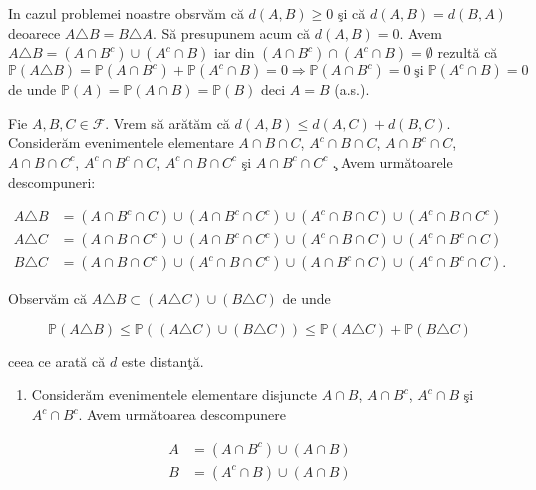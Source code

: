 \documentclass[]{article}
\providecommand{\tightlist}{%
  \setlength{\itemsep}{0pt}\setlength{\parskip}{0pt}}
\def\PP{{\mathbb P}}
\def\MF{{\mathcal F}}
\begin{document}
In cazul problemei noastre obsrv\u am c\u a \(d(A,B)\geq 0\) \c si c\u a
\(d(A,B)=d(B,A)\) deoarece \(A\triangle B=B\triangle A\). S\u a
presupunem acum c\u a \(d(A,B)=0\). Avem
\(A\triangle B=\left(A\cap B^c\right)\cup\left(A^c\cap B\right)\) iar
din \(\left(A\cap B^c\right)\cap\left(A^c\cap B\right)=\emptyset\)
rezult\u a c\u a \[
  \PP(A\triangle B)= \PP(A\cap B^c) + \PP(A^c\cap B)=0\Rightarrow \PP(A\cap B^c)=0\;\mbox{\c si}\;\PP(A^c\cap B)=0
\] de unde \(\PP(A)=\PP(A\cap B)=\PP(B)\) deci \(A=B\) (a.s.).

Fie \(A, B, C\in \MF\). Vrem s\u a ar\u at\u am c\u a
\(d(A,B)\leq d(A,C)+d(B,C)\). Consider\u am evenimentele elementare
\(A\cap B\cap C\), \(A^c\cap B\cap C\), \(A\cap B^c\cap C\),
\(A\cap B\cap C^c\), \(A^c\cap B^c\cap C\), \(A^c\cap B\cap C^c\) \c si
\(A\cap B^c\cap C^c\) \c. Avem urm\u atoarele descompuneri:

\begin{align*}
  A\triangle B &= \left(A\cap B^c\cap C\right)\cup\left(A\cap B^c\cap C^c\right)\cup\left(A^c\cap B\cap C\right)\cup\left(A^c\cap B\cap C^c\right)\\
  A\triangle C &= \left(A\cap B\cap C^c\right)\cup\left(A\cap B^c\cap C^c\right)\cup\left(A^c\cap B\cap C\right)\cup\left(A^c\cap B^c\cap C\right)\\
  B\triangle C &= \left(A\cap B\cap C^c\right)\cup\left(A^c\cap B\cap C^c\right)\cup\left(A\cap B^c\cap C\right)\cup\left(A^c\cap B^c\cap C\right).
\end{align*}

Observ\u am c\u a
\(A\triangle B\subset\left(A\triangle C\right)\cup\left(B\triangle C\right)\)
de unde

\[
  \PP(A\triangle B)\leq\PP\left(\left(A\triangle C\right)\cup\left(B\triangle C\right)\right)\leq\PP(A\triangle C)+\PP(B\triangle C)
\]

ceea ce arat\u a c\u a \(d\) este distan\c t\u a.

\begin{enumerate}
\def\labelenumi{\alph{enumi})}
\setcounter{enumi}{1}
\tightlist
\item
  Consider\u am evenimentele elementare disjuncte \(A\cap B\),
  \(A\cap B^c\), \(A^c\cap B\) \c si \(A^c\cap B^c\). Avem urm\u atoarea
  descompunere
\end{enumerate}

\begin{align*}
  A &= \left(A\cap B^c\right)\cup\left(A\cap B\right)\\
  B &= \left(A^c\cap B\right)\cup\left(A\cap B\right)
\end{align*}
\end{document}
